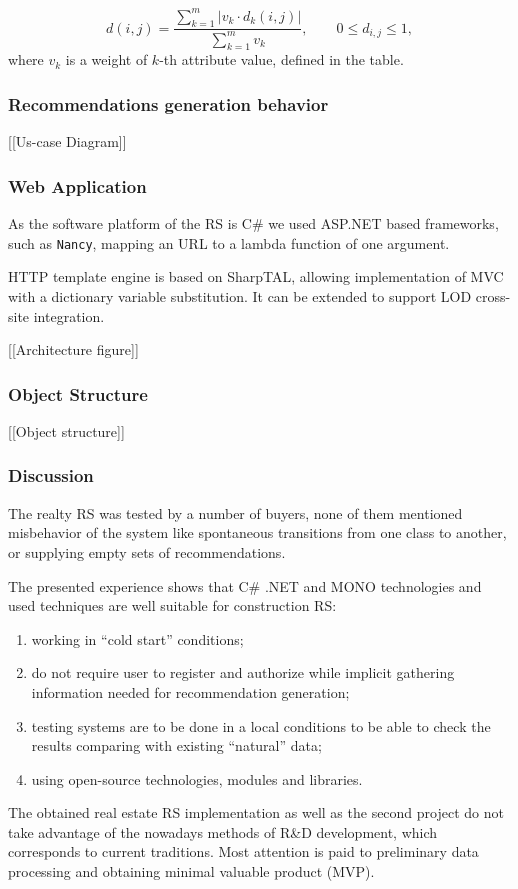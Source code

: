 \documentclass[10pt,dvipsnames]{beamer}
\begin{document}
\begin{frame}
\[
  d(i,j)=\frac{\sum\limits_{k=1}^m|v_k\cdot d_k(i,j)|}{\sum\limits_{k=1}^m v_k}, \qquad 0\leqslant d_{i,j}\leqslant 1,
\]
\noindent where $v_k$ is a weight of $k$-th attribute value, defined in the table.

\end{frame}

\begin{frame}
  \frametitle{Recommendations generation behavior}




  [[Us-case Diagram]]
\end{frame}

\begin{frame}
  \frametitle{Web Application}
  As the software platform of the RS is C\# we used ASP.NET based frameworks, such as \texttt{Nancy}, mapping an URL to a lambda function of one argument.

  HTTP template engine is based on SharpTAL, allowing implementation of MVC with a dictionary variable substitution.  It can be extended to support LOD cross-site integration.

  [[Architecture figure]]

\end{frame}


\begin{frame}
  \frametitle{Object Structure}

  [[Object structure]]

\end{frame}

\begin{frame}
  \frametitle{Discussion}
  The realty RS was tested by a number of buyers, none of them mentioned misbehavior of the system like spontaneous transitions from one class to another, or supplying empty sets of recommendations.

The presented experience shows that C\# .NET and MONO technologies and used techniques are well suitable for construction RS:
\begin{enumerate}
\item working in ``cold start'' conditions;
\item do not require user to register and authorize while implicit gathering information needed for recommendation generation;
\item testing systems are to be done in a local conditions to be able to check the results comparing with existing ``natural'' data;
\item using open-source technologies, modules and libraries.
\end{enumerate}

The obtained real estate RS implementation as well as the second project do not take advantage of the nowadays methods of R\&D development, which corresponds to current traditions.  Most attention is paid to preliminary data processing and obtaining minimal valuable product (MVP).
\end{frame}
\end{document}
